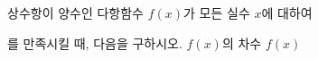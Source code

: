 상수항이 양수인 다항함수 $f(x)$가 모든 실수 $x$에 대하여\par\smallskip{}\par\smallskip\noindent 를 만족시킬 때, 다음을 구하시오.
 $f(x)$의 차수
 $f(x)$
